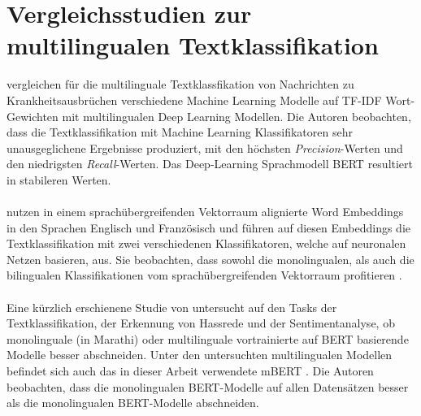 \documentclass[ngerman]{ttlab-qualify}
\begin{document}
\section{Vergleichsstudien zur multilingualen Textklassifikation}
\textcite{multilingual_tc_epidemic} vergleichen für die multilinguale Textklassfikation von Nachrichten zu Krankheitsausbrüchen verschiedene Machine Learning Modelle auf TF-IDF Wort-Gewichten mit multilingualen Deep Learning Modellen. Die Autoren beobachten, dass die Textklassifikation mit Machine Learning Klassifikatoren sehr unausgeglichene Ergebnisse produziert, mit den höchsten \textit{Precision}-Werten und den niedrigsten \textit{Recall}-Werten. Das Deep-Learning Sprachmodell BERT resultiert in stabileren Werten.\\
\\
\textcite{jiang2019cross} nutzen in einem sprachübergreifenden Vektorraum alignierte Word Embeddings in den Sprachen Englisch und Französisch und führen auf diesen Embeddings die Textklassifikation mit zwei verschiedenen Klassifikatoren, welche auf neuronalen Netzen basieren, aus. Sie beobachten, dass sowohl die monolingualen, als auch die bilingualen Klassifikationen vom sprachübergreifenden Vektorraum profitieren \parencite{jiang2019cross}.\\
\\
Eine kürzlich erschienene Studie von \textcite{mono_vs_multi_BERT} untersucht auf den Tasks der Textklassifikation, der Erkennung von Hassrede und der Sentimentanalyse, ob monolinguale (in Marathi) oder multilinguale vortrainierte auf BERT basierende Modelle besser abschneiden. Unter den untersuchten multilingualen Modellen befindet sich auch das in dieser Arbeit verwendete mBERT \parencite{devlin-etal-2019-bert}. Die Autoren beobachten, dass die monolingualen BERT-Modelle auf allen Datensätzen besser als die monolingualen BERT-Modelle abschneiden.
\end{document}
